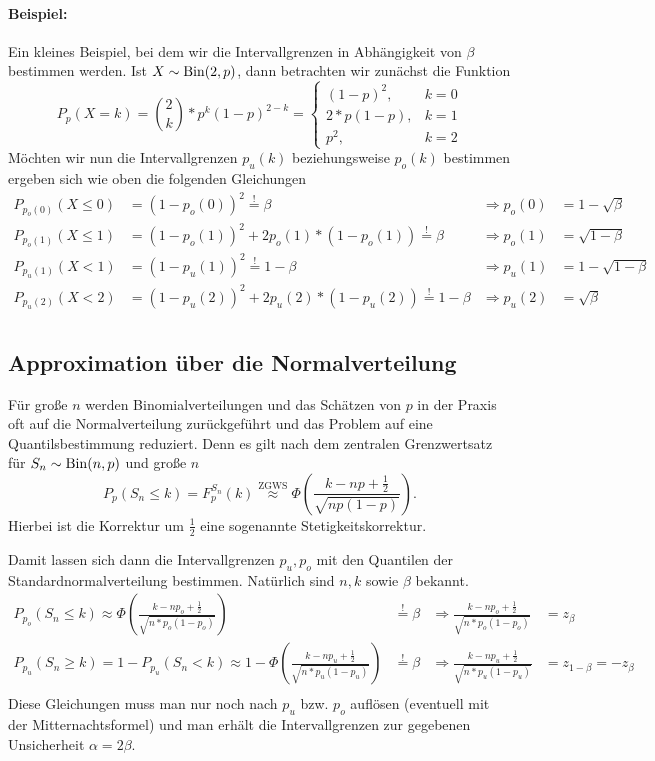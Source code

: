 \paragraph{Beispiel:}
Ein kleines Beispiel, bei dem wir die Intervallgrenzen in Abhängigkeit von $\beta$ bestimmen werden.
Ist $X\sim\operatorname{Bin}(2,p)$, dann betrachten wir zunächst die Funktion
\begin{equation*}
	P_p(X=k)=\binom 2k* p^k(1-p)^{2-k}=\begin{cases}
		(1-p)^2,&k=0\\
		2*p(1-p),&k=1\\
		p^2,&k=2
	\end{cases}
\end{equation*}
Möchten wir nun die Intervallgrenzen $p_u(k)$ beziehungsweise $p_o(k)$ bestimmen ergeben sich wie oben die folgenden Gleichungen
\begin{align*}
	P_{p_o(0)}(X\leq 0)&=(1-p_o(0))^2\overset!=\beta&\Rightarrow p_o(0)&=1-\sqrt\beta\\
	P_{p_o(1)}(X\leq 1)&=(1-p_o(1))^2+2p_o(1)*(1-p_o(1))\overset!= \beta &\Rightarrow p_o(1)&=\sqrt{1-\beta}\\
	P_{p_u(1)}(X<1)&=(1-p_u(1))^2\overset!=1-\beta&\Rightarrow p_u(1)&=1-\sqrt{1-\beta}\\
	P_{p_u(2)}(X<2)&=(1-p_u(2))^2+2p_u(2)*(1-p_u(2))\overset!=1-\beta &\Rightarrow p_u(2)&=\sqrt{\beta}\\
\end{align*}

\subsection{Approximation über die Normalverteilung}
Für große $n$ werden Binomialverteilungen und das Schätzen von $p$ in der Praxis oft auf die Normalverteilung zurückgeführt und das Problem auf eine Quantilsbestimmung reduziert.
Denn es gilt nach dem zentralen Grenzwertsatz für $S_n\sim\operatorname{Bin}(n,p)$ und große $n$
\begin{equation*}
	P_p(S_n\leq k) = F^{S_n}_p(k)\overset{\text{ZGWS}}\approx \Phi\left(\frac{k-np+\frac12}{\sqrt{np(1-p)}}\right).
\end{equation*}
Hierbei ist die Korrektur um $\frac12$ eine sogenannte Stetigkeitskorrektur.

Damit lassen sich dann die Intervallgrenzen $p_u,p_o$ mit den Quantilen der Standardnormalverteilung bestimmen. Natürlich sind $n,k$ sowie $\beta$ bekannt.
\begin{align*}
	P_{p_o}(S_n\leq k)\approx \Phi\left(\frac{k-np_o+\frac12}{\sqrt{n*p_o(1-p_o)}}\right)&\overset!=\beta
	&\Rightarrow \frac{k-np_o+\frac12}{\sqrt{n*p_o(1-p_o)}}&=z_\beta\\
	P_{p_u}(S_n\geq k)=1-P_{p_u}(S_n<k)\approx 1-\Phi\left(\frac{k-np_u+\frac12}{\sqrt{n*p_u(1-p_u)}}\right)&\overset!=\beta
	&\Rightarrow \frac{k-np_u+\frac12}{\sqrt{n*p_u(1-p_u)}}&=z_{1-\beta}=-z_\beta\\
\end{align*}
Diese Gleichungen muss man nur noch nach $p_u$ bzw. $p_o$ auflösen (eventuell mit der Mitternachtsformel) und man erhält die Intervallgrenzen zur gegebenen Unsicherheit $\alpha=2\beta$.

